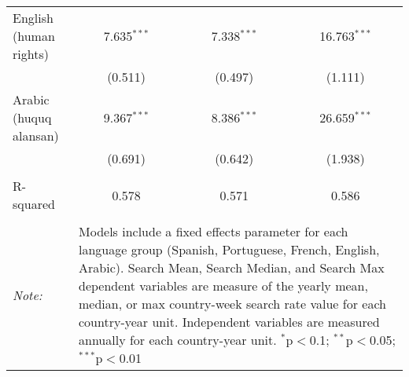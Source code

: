 \begin{table}[!htbp]
\begin{tabular}{@{\extracolsep{5pt}}lccc}
  English (human rights) & 7.635$^{***}$ & 7.338$^{***}$ & 16.763$^{***}$ \\ 
  & (0.511) & (0.497) & (1.111) \\ 
  Arabic (huquq alansan) & 9.367$^{***}$ & 8.386$^{***}$ & 26.659$^{***}$ \\ 
  & (0.691) & (0.642) & (1.938) \\ 
 \hline \\[-1.8ex] 
R-squared  & 0.578 & 0.571 & 0.586 \\ 
\hline 
\hline \\[-1.8ex] 
\textit{Note:}  & \multicolumn{3}{l}{\parbox[t]{8cm}{Models include a fixed effects parameter for each language group (Spanish, Portuguese, French, English, Arabic). Search Mean, Search Median, and Search Max dependent variables are measure of the yearly mean, median, or max country-week search rate value for each country-year unit. Independent variables are measured annually for each country-year unit. $^{*}$p$<$0.1; $^{**}$p$<$0.05; $^{***}$p$<$0.01}} \\ 
\end{tabular} 
\end{table} 
